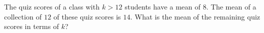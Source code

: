 The quiz scores of a class with $k>12$ students have a mean of $8$. The mean of a collection of $12$ of these quiz scores is $14$. What is the mean of the remaining quiz scores in terms of $k$?
